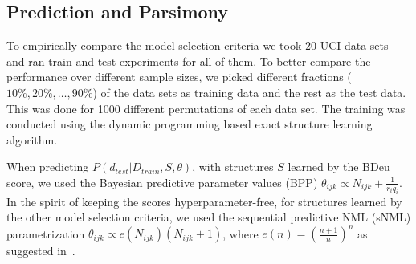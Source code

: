 \subsection{Prediction and Parsimony}

To empirically compare the model selection criteria we took 20 UCI
data sets~\cite{Lichman:2013} and ran train and test experiments for
all of them. To better compare the performance over different sample
sizes, we picked different fractions ($10\%, 20\%, \ldots, 90\%$) of
the data sets as training data and the rest as the test data.
This was done for 1000 different permutations of each data set.
The training was conducted using the dynamic
programming based exact structure learning algorithm.

When predicting $P(d_{test}|D_{train},S,\theta)$,
with structures $S$ learned by the BDeu score, we used the
Bayesian predictive parameter values (BPP) $\theta_{ijk} \propto
N_{ijk}+\frac{1}{r_iq_i}$.  In the spirit of keeping the scores
hyperparameter-free, for structures learned by the other model
selection criteria, we used the sequential predictive NML (sNML)
parametrization $\theta_{ijk}\propto e(N_{ijk})(N_{ijk}+1)$, where
$e(n)=(\frac{n+1}{n})^n$ as suggested in~\cite{Riss07b}.

